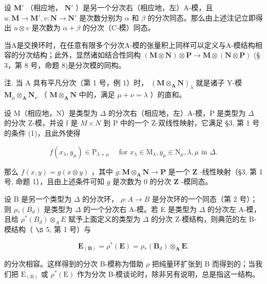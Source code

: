 设 \(\mathbf{M}'\) （相应地， \(\mathbf{N}'\) ）是另一个分次右（相应地，左）A-模，且 \(u: \mathbf{M} \to \mathbf{M}', v: \mathbf{N} \to \mathbf{N}'\) 是次数分别为 \(\alpha\) 和 \(\beta\) 的分次同态。那么由上述注记立即得出 \(u \otimes v\) 是次数为 \(\alpha + \beta\) 的分次（C-模）同态。

当A是交换环时，在任意有限多个分次A-模的张量积上同样可以定义与A-模结构相容的分次结构；此外，显然诸如结合性同构 \((\mathbf{M} \otimes \mathbf{N}) \otimes \mathbf{P} \to \mathbf{M} \otimes (\mathbf{N} \otimes \mathbf{P})\) (§ 3，第 8 号，命题 8)是分次模的同构。

注. 当 A 具有平凡分次（第 1 号，例 1）时， \((\mathbf{M} \otimes_{\mathbf{A}} \mathbf{N})_{\lambda}\) 就是诸子 Y-模 \(\mathbf{M}_{\mu} \otimes_{\mathbf{A}} \mathbf{N}_{\nu}\) （ \(\mathbf{M} \otimes_{\mathbf{A}} \mathbf{N}\) 中的，满足 \(\mu + \nu = \lambda\) ）的直和。

设 M（相应地，N）是类型为 \(\Delta\) 的分次右（相应地，左）A-模，P 是类型为 \(\Delta\) 的分次 Z-模，并设 f 是 \(M \times N\) 到 P 中的一个 Z-双线性映射，它满足 §3, 第 1 号的条件 (1)，且此外使得

\[
f (x _ {\lambda}, y _ {\mu}) \in \mathrm{P} _ {\lambda + \mu} \quad \text { for } x _ {\lambda} \in \mathrm{M} _ {\lambda}, y _ {\mu} \in \mathrm{N} _ {\mu}, \lambda , \mu \text { in } \Delta .
\]

那么 \(f(x, y) = g(x \otimes y)\) ，其中 \(g: \mathbf{M} \otimes_{\mathbf{A}} \mathbf{N} \to \mathbf{P}\) 是一个 \(\mathbf{Z}\) -线性映射（§3, 第 1 号, 命题 1），且由上述条件可知 \(g\) 是次数为 0 的分次 \(\mathbf{Z}\) -模同态。

设 B 是另一个类型为 \(\Delta\) 的分次环， \(\rho: A \to B\) 是分次环的一个同态（第 2 号）；则 \(\rho_*(B_d)\) 是类型为 \(\Delta\) 的一个分次右 A-模。若 E 是类型为 \(\Delta\) 的分次左 A-模，且给 \(\rho^*(B_d) \otimes_A E\) 赋予上面定义的类型为 \(\Delta\) 的分次 Z-模结构，则典范的左 B-模结构（ \(\S\) 5, 第 1 号）与

\[
\mathbf {E} _ {(\mathbf {B})} = \rho^ {*} (\mathbf {E}) = \rho_ {*} (\mathbf {B} _ {d}) \otimes_ {\mathbf {A}} \mathbf {E}.
\]

的分次相容。这样得到的分次 B-模称为借助 \(\rho\) 把纯量环扩张到 B 而得到的；当我们把 \(\mathrm{E}_{(\mathrm{B})}\) 或 \(\rho^{*}(\mathrm{E})\) 作为分次 B-模谈论时，除非另有说明，总是指这一结构。

